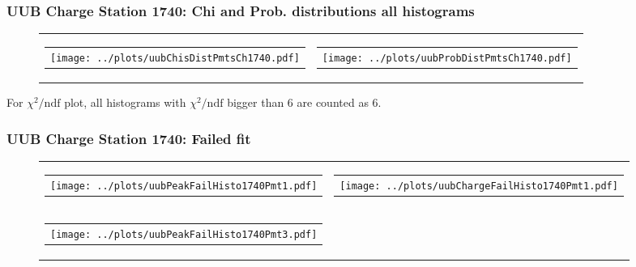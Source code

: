 \documentclass[aspectratio=169]{beamer}
\begin{document}
\begin{frame}
  \frametitle{UUB Charge Station 1740: Chi and Prob. distributions all histograms}
  \begin{figure}
    \centering
    \begin{tabularx}{\textwidth}{CC}
      \begin{tabular}{l}
        \texttt{[image: ../plots/uubChisDistPmtsCh1740.pdf]}
      \end{tabular}
      &
      \begin{tabular}{l}
        \texttt{[image: ../plots/uubProbDistPmtsCh1740.pdf]}
      \end{tabular}
    \end{tabularx}
  \end{figure}
  For $\chi^2 / \mathrm{ndf}$ plot, all histograms with $\chi^2 / \mathrm{ndf}$ 
  bigger than 6 are counted as 6.
\end{frame}


\begin{frame}
  \frametitle{UUB Charge Station 1740: Failed fit}
  \begin{figure}
    \centering
    \begin{tabularx}{\textwidth}{CC}
      \begin{tabular}{l}
        \texttt{[image: ../plots/uubPeakFailHisto1740Pmt1.pdf]}
      \end{tabular}
      &
      \begin{tabular}{l}
        \texttt{[image: ../plots/uubChargeFailHisto1740Pmt1.pdf]}
      \end{tabular}
      \\
      \begin{tabular}{l}
        \texttt{[image: ../plots/uubPeakFailHisto1740Pmt3.pdf]}
      \end{tabular}
    \end{tabularx}
  \end{figure}
\end{frame}
\end{document}
